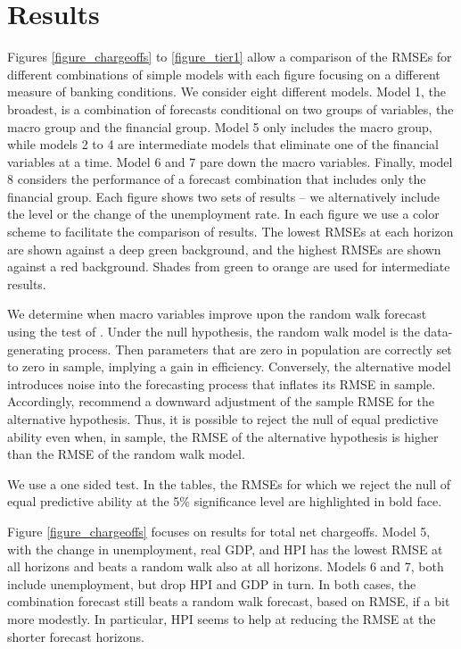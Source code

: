 \documentclass[12pt]{article}
\begin{document}
\section{Results} \label{section_results}

Figures \ref{figure_chargeoffs} to \ref{figure_tier1} allow a
comparison of the RMSEs for different combinations of simple
models with each figure focusing on a different measure of banking
conditions. We consider eight different models. Model 1, the
broadest, is a combination of forecasts conditional on two groups
of variables, the macro group and the financial group. Model 5
only includes the macro group, while models 2 to 4 are
intermediate models that eliminate one of the financial variables
at a time. Model 6 and 7 pare down the macro variables. Finally,
model 8 considers the performance of a forecast combination that
includes only the financial group. Each figure shows two sets of
results -- we alternatively include the level or the change of the
unemployment rate. In each figure we use a color scheme to
facilitate the comparison of results. The lowest RMSEs at each
horizon are shown against a deep green background, and the highest
RMSEs are shown against a red background. Shades from green to
orange are used for intermediate results.

We determine when macro variables improve upon the random walk
forecast using the test of . Under the null
hypothesis, the random walk model is the data-generating process.
Then parameters that are zero in population are correctly set to
zero in sample, implying a gain in efficiency.  Conversely, the
alternative model introduces noise into the forecasting process
that inflates its RMSE in sample. Accordingly, 
recommend a downward adjustment of the sample RMSE for the
alternative hypothesis. Thus, it is possible to reject the null of
equal predictive ability even when, in sample, the RMSE of the
alternative hypothesis is higher than the RMSE of the random walk
model.

We use a one sided test. In the tables, the RMSEs for which we
reject the null of equal predictive ability at the 5\%
significance level are highlighted in bold face.

Figure \ref{figure_chargeoffs} focuses on results for total net
chargeoffs. Model 5, with the change in unemployment, real GDP,
and HPI has the lowest RMSE at all horizons and beats a random
walk also at all horizons. Models 6 and 7, both include
unemployment, but drop HPI and GDP in turn.  In both cases, the
combination forecast still beats a random walk forecast, based on
RMSE, if a bit more modestly. In particular, HPI seems to help at
reducing the RMSE at the shorter forecast horizons.
\end{document}
